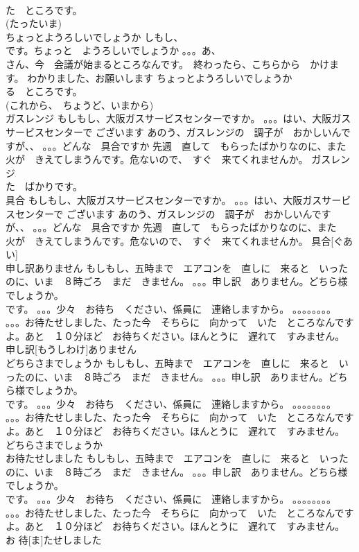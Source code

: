 \documentclass[8pt]{extreport}
\begin{document}
\begin{CJK}{UTF8}{min}
\\	た　ところです。　
\\	(たったいま)		
\\	ちょっとようろしいでしょうか	しもし、
\\	です。ちょっと　ようろしいでしょうか 。。。あ、
\\	さん、今　会議が始まるところなんです。　終わったら、こちらから　かけます。 わかりました、お願いします	ちょっとようろしいでしょうか				
\\	る　ところです。
\\	(これから、　ちょうど、いまから)		
\\	ガスレンジ	もしもし、大阪ガスサービスセンターですか。 。。。はい、大阪ガスサービスセンターで ございます あのう、ガスレンジの　調子が　おかしいんですが、、 。。。どんな　具合ですか 先週　直して　もらったばかりなのに、また　火が　きえてしまうんです。危ないので、　すぐ　来てくれませんか。	ガスレンジ				
\\	た　ばかりです。
\\	具合	もしもし、大阪ガスサービスセンターですか。 。。。はい、大阪ガスサービスセンターで ございます あのう、ガスレンジの　調子が　おかしいんですが、、 。。。どんな　具合ですか 先週　直して　もらったばかりなのに、また　火が　きえてしまうんです。危ないので、　すぐ　来てくれませんか。	具合[ぐあい]					
\\	申し訳ありません	もしもし、五時まで　エアコンを　直しに　来ると　いったのに、いま　８時ごろ　まだ　きません。 。。。申し訳　ありません。どちら様でしょうか。 
\\	です。 。。。少々　お待ち　ください、係員に　連絡しますから。 。。。。。。。。 。。。お待たせしました、たった今　そちらに　向かって　いた　ところなんですよ。あと　１０分ほど　お待ちください。ほんとうに　遅れて　すみません。	申し訳[もうしわけ]ありません					
\\	どちらさまでしょうか	もしもし、五時まで　エアコンを　直しに　来ると　いったのに、いま　８時ごろ　まだ　きません。 。。。申し訳　ありません。どちら様でしょうか。 
\\	です。 。。。少々　お待ち　ください、係員に　連絡しますから。 。。。。。。。。 。。。お待たせしました、たった今　そちらに　向かって　いた　ところなんですよ。あと　１０分ほど　お待ちください。ほんとうに　遅れて　すみません。	どちらさまでしょうか						
\\	お待たせしました	もしもし、五時まで　エアコンを　直しに　来ると　いったのに、いま　８時ごろ　まだ　きません。 。。。申し訳　ありません。どちら様でしょうか。 
\\	です。 。。。少々　お待ち　ください、係員に　連絡しますから。 。。。。。。。。 。。。お待たせしました、たった今　そちらに　向かって　いた　ところなんですよ。あと　１０分ほど　お待ちください。ほんとうに　遅れて　すみません。	お 待[ま]たせしました					

\end{CJK}
\end{document}
